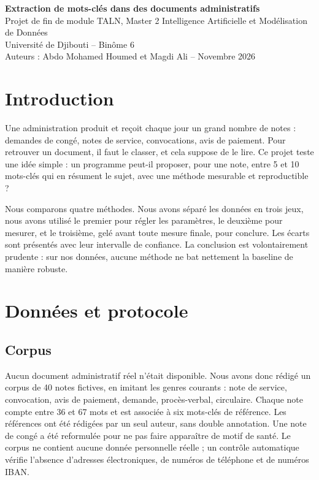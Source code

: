 \documentclass[11pt,a4paper]{article}
\begin{document}
\begin{center}
\textbf{Extraction de mots-clés dans des documents administratifs}\\[2pt]
Projet de fin de module TALN, Master 2 Intelligence Artificielle et Modélisation de Données\\
Université de Djibouti \quad -- \quad Binôme 6\\
Auteurs : Abdo Mohamed Houmed et Magdi Ali \quad -- \quad Novembre 2026
\end{center}

\section{Introduction}

Une administration produit et reçoit chaque jour un grand nombre de notes : demandes de congé, notes de service, convocations, avis de paiement. Pour retrouver un document, il faut le classer, et cela suppose de le lire. Ce projet teste une idée simple : un programme peut-il proposer, pour une note, entre 5 et 10 mots-clés qui en résument le sujet, avec une méthode mesurable et reproductible ?

Nous comparons quatre méthodes. Nous avons séparé les données en trois jeux, nous avons utilisé le premier pour régler les paramètres, le deuxième pour mesurer, et le troisième, gelé avant toute mesure finale, pour conclure. Les écarts sont présentés avec leur intervalle de confiance. La conclusion est volontairement prudente : sur nos données, aucune méthode ne bat nettement la baseline de manière robuste.

\section{Données et protocole}

\subsection{Corpus}

Aucun document administratif réel n'était disponible. Nous avons donc rédigé un corpus de 40 notes fictives, en imitant les genres courants : note de service, convocation, avis de paiement, demande, procès-verbal, circulaire. Chaque note compte entre 36 et 67 mots et est associée à six mots-clés de référence. Les références ont été rédigées par un seul auteur, sans double annotation. Une note de congé a été reformulée pour ne pas faire apparaître de motif de santé. Le corpus ne contient aucune donnée personnelle réelle ; un contrôle automatique vérifie l'absence d'adresses électroniques, de numéros de téléphone et de numéros IBAN.
\end{document}
